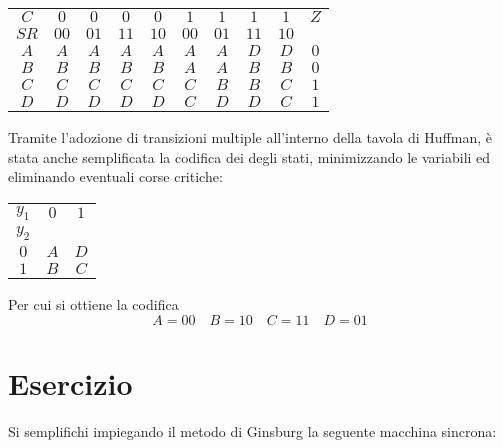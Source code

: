 \documentclass[a4paper]{extarticle}
\renewcommand\arraystretch{}
\begin{document}
\vspace{1em}
\noindent
\begin{table}[H]
\setlength{\tabcolsep}{4pt}
\renewcommand{\arraystretch}{1.2}
\centering
\begin{tabular}{c|cccc|cccc|c}
    \hline
    $C$ & $0$ & $0$ & $0$ & $0$ & $1$ & $1$ & $1$ & $1$ & $Z$\\
    $SR$ & $00$ & $01$ & $11$ & $10$ & $00$ & $01$ & $11$ & $10$ & \\
    \hline
    $A$ & $A$ & $A$ & $A$ & $A$ & \cellcolor{orange!25} $A$ & \cellcolor{orange!25} $A$ & $D$ & $D$ & $0$\\
    $B$ & $B$ & $B$ & $B$ & $B$ & $A$ & $A$ & \cellcolor{orange!25} $B$ & \cellcolor{orange!25} $B$ & $0$\\
    $C$ & $C$ & $C$ & $C$ & $C$ & \cellcolor{orange!25} $C$ & $B$ & $B$ & \cellcolor{orange!25} $C$ & $1$\\ 
    $D$ & $D$ & $D$ & $D$ & $D$ & $C$ & \cellcolor{orange!25} $D$ & \cellcolor{orange!25} $D$ & $C$ & $1$\\
    \hline
\end{tabular}
\end{table}

\vspace{1em}
\noindent
Tramite l'adozione di transizioni multiple all'interno della tavola di Huffman, è stata anche semplificata la codifica dei degli stati, minimizzando le variabili ed eliminando eventuali corse critiche:

\vspace{1em}
\noindent
\begin{table}[H]
\setlength{\tabcolsep}{4pt}
\renewcommand{\arraystretch}{1.2}
\centering
\begin{tabular}{c|c|c|}
    \hline
    $y_1$ & $0$ & $1$\\
    $y_2$ &     &    \\
    \hline
    $0$ & $A$ & $D$\\
    $1$ & $B$ & $C$
\end{tabular}
\end{table}

\vspace{1em}
\noindent
Per cui si ottiene la codifica
\[A=00 \hspace{1em} B=10 \hspace{1em} C=11 \hspace{1em} D=01\]

\noindent
\section{Esercizio}
Si semplifichi impiegando  il metodo di Ginsburg la seguente macchina sincrona:
\end{document}
